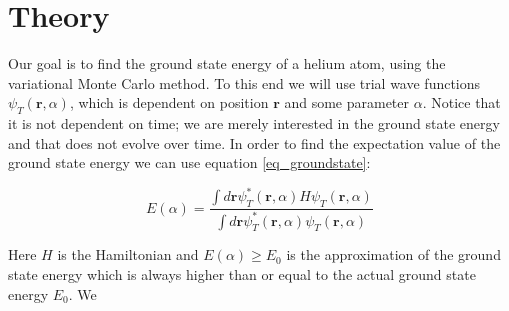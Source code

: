 \section{Theory}

Our goal is to find the ground state energy of a helium atom, using the variational Monte Carlo method. To this end we will use trial wave functions $\psi_T(\textbf{r},\alpha)$, which is dependent on position $\textbf{r}$ and some parameter $\alpha$. Notice that it is not dependent on time; we are merely interested in the ground state energy and that does not evolve over time. In order to find the expectation value of the ground state energy we can use equation \ref{eq_groundstate}: 

\begin{equation}\label{eq_groundstate}
E(\alpha) = \frac{\int d\textbf{r} \psi_T^*(\textbf{r},\alpha)H\psi_T(\textbf{r},\alpha)}{\int d\textbf{r} \psi_T^*(\textbf{r},\alpha)\psi_T(\textbf{r},\alpha)}
\end{equation}

Here $H$ is the Hamiltonian and $E(\alpha) \geq E_0$ is the approximation of the ground state energy which is always higher than or equal to the actual ground state energy $E_0$.  We 